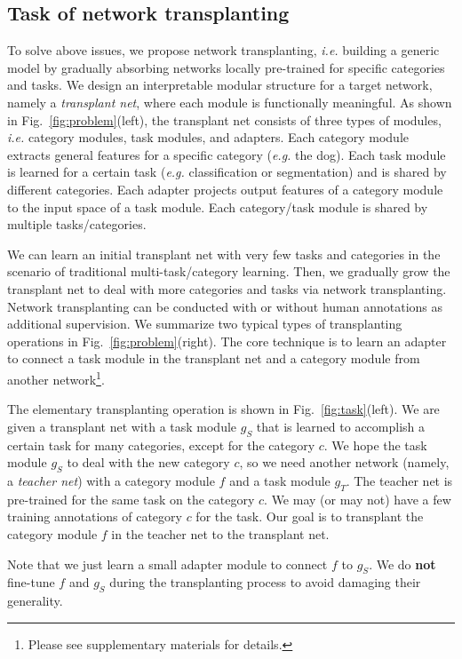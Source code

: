 \documentclass[10pt,twocolumn,letterpaper]{article}
\begin{document}
\subsection{Task of network transplanting}

To solve above issues, we propose network transplanting, \emph{i.e.} building a generic model by gradually absorbing networks locally pre-trained for specific categories and tasks. We design an interpretable modular structure for a target network, namely a \textit{transplant net}, where each module is functionally meaningful. As shown in Fig.~\ref{fig:problem}(left), the transplant net consists of three types of modules, \emph{i.e.} category modules, task modules, and adapters. Each category module extracts general features for a specific category (\emph{e.g.} the dog). Each task module is learned for a certain task (\emph{e.g.} classification or segmentation) and is shared by different categories. Each adapter projects output features of a category module to the input space of a task module. Each category/task module is shared by multiple tasks/categories.

We can learn an initial transplant net with very few tasks and categories in the scenario of traditional multi-task/category learning. Then, we gradually grow the transplant net to deal with more categories and tasks via network transplanting. Network transplanting can be conducted with or without human annotations as additional supervision. We summarize two typical types of transplanting operations in Fig.~\ref{fig:problem}(right). The core technique is to learn an adapter to connect a task module in the transplant net and a category module from another network\footnote[1]{Please see supplementary materials for details.}.

The elementary transplanting operation is shown in Fig.~\ref{fig:task}(left). We are given a transplant net with a task module $g_{S}$ that is learned to accomplish a certain task for many categories, except for the category $c$. We hope the task module $g_{S}$ to deal with the new category $c$, so we need another network (namely, a \textit{teacher net}) with a category module $f$ and a task module $g_{T}$. The teacher net is pre-trained for the same task on the category $c$. We may (or may not) have a few training annotations of category $c$ for the task. Our goal is to transplant the category module $f$ in the teacher net to the transplant net.

Note that we just learn a small adapter module to connect $f$ to $g_{S}$. We do \textbf{not} fine-tune $f$ and $g_{S}$ during the transplanting process to avoid damaging their generality.
\end{document}
